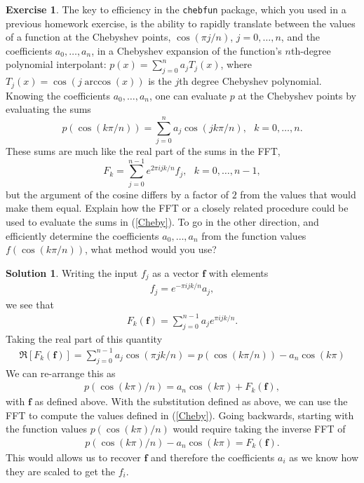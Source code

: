 \documentclass[12pt]{article}
\renewcommand{\vec}[1]{\mathbf{#1}}
\theoremstyle{definition}
\newtheorem{exer}{Exercise}
\newtheorem{sol}{Solution}
\theoremstyle{remark}
\begin{document}
\begin{exer}
    The key to efficiency in the \verb+chebfun+ package, which you used in a previous homework
exercise, is the ability to rapidly translate between the values of a function at the
Chebyshev points, $\cos ( \pi j/n )$, $j=0, \ldots , n$, and the coefficients $a_0 , \ldots , a_n$,
in a Chebyshev expansion of the function's $n$th-degree polynomial interpolant:
$p(x) = \sum_{j=0}^n a_j T_j (x)$, where $T_j (x) = \cos ( j \arccos (x) )$ is the $j$th
degree Chebyshev polynomial.  Knowing the coefficients $a_0 , \ldots , a_n$, one can evaluate
$p$ at the Chebyshev points by evaluating the sums
\begin{equation}
p ( \cos ( k \pi / n ) ) = \sum_{j=0}^n a_j \cos ( j k \pi / n ) ,~~~k=0, \ldots , n.
\label{Cheby}
\end{equation}
These sums are much like the real part of the sums in the FFT,
\[
F_k = \sum_{j=0}^{n-1} e^{2 \pi i j k / n} f_j ,~~~k=0, \ldots , n-1 ,
\]
but the argument of the cosine differs by a factor of $2$ from the values that would make
them equal.  Explain how the FFT or a closely related procedure could be used to evaluate
the sums in (\ref{Cheby}).  To go in the other direction, and efficiently determine the coefficients
$a_0 , \ldots , a_n$ from the function values $f( \cos ( k \pi / n ) )$, what method would you use?

\end{exer}

\begin{sol}
    Writing the input $f_{j}$ as a vector $\vec{f}$ with elements
     \begin{align*}
         f_{j} = e^{- \pi i j k / n} a_{j},
    \end{align*}
    we see that
    \begin{align*}
        F_{k}(\vec{f}) = \sum_{j=0}^{n-1} a_{j} e^{\pi i jk / n}.
    \end{align*}
    Taking the real part of this quantity
    \begin{align*}
        \Re[F_{k}(\vec{f})] = \sum_{j=0}^{n-1} a_{j} \cos( \pi jk / n ) = p(\cos(k \pi / n)) - a_{n}\cos(k\pi)
    \end{align*}
    We can re-arrange this as
    \begin{align*}
        p(\cos(k\pi) / n) = a_{n} \cos(k \pi) + F_{k}(\vec{f}),
    \end{align*}
    with $\vec{f}$ as defined above. With the substitution defined as above, we can use the FFT to compute the values defined in (\ref{Cheby}). Going backwards, starting with the function values $ p(\cos(k\pi) / n)$ would require taking the inverse FFT of 
    \begin{align*}
        p(\cos(k\pi) / n) - a_{n} \cos(k \pi) = F_{k}(\vec{f}).
    \end{align*}
    This would allows us to recover $\vec{f}$ and therefore the coefficients $a_{i}$ as we know how they are scaled to get the $f_{i}$.
  \end{sol}
\end{document}
